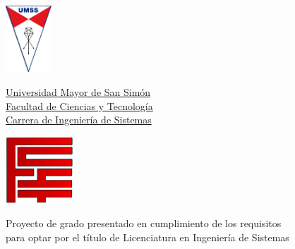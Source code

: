 \documentclass[11pt,spanish,singlespacing,headsepline]{MastersDoctoralThesis}
\author{Evelyn \textsc{Cusi López}}
\begin{document}

\frontmatter %

\pagestyle{plain} %
\begin{titlepage}

\begin{minipage}[l]{.15\linewidth}
\includegraphics[height=2.5cm]{imagenes/umss}
\end{minipage}
\begin{minipage}[c]{.65\textwidth}
\begin{center}
\href{http://www.umss.edu.bo}{\LARGE{Universidad Mayor de San Simón}} \\
\href{http://www.fcyt.umss.edu.bo}{\LARGE{Facultad de Ciencias y Tecnología}} \\
\href{http://www.cs.umss.edu.bo}{\LARGE{Carrera de Ingeniería de Sistemas}}
\end{center}
\end{minipage}
\begin{minipage}[r]{.15\linewidth}
\includegraphics[height=2.5cm]{imagenes/logo}
\end{minipage}

\vfill
\begin{center}
\Huge {\bf{\ttitle}}	
\end{center}
\singlespacing
\singlespacing
\singlespacing
\singlespacing
\singlespacing
\singlespacing
\begin{center}
{\large Proyecto de grado presentado en cumplimiento de los requisitos\\ para optar por el t\'{i}tulo de Licenciatura en Ingenier\'{i}a de Sistemas}
\end{center}
\vspace{\fill}


\end{titlepage}
\end{document}
